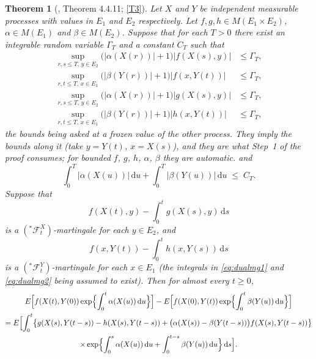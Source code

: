 \documentclass[11pt,a4paper]{article}
\theoremstyle{plain}
\newtheorem{theorem}{Theorem}[section]
\theoremstyle{definition}
\theoremstyle{remark}
\newcommand{\Meas}{M}                          %
\newcommand{\Filt}{\mathcal{F}}
\newcommand{\dif}{\,\mathrm{d}}
\newcommand{\EK}{\cite{EK86}}
\begin{document}
\begin{theorem}[\EK, Theorem 4.4.11; \eqref{T3}]
  \label{thm:duality}
  Let $X$ and $Y$ be independent measurable processes with values in $E_1$ and
  $E_2$ respectively.  Let $f,g,h \in \Meas(E_1 \times E_2)$,
  $\alpha \in \Meas(E_1)$ and $\beta \in \Meas(E_2)$.  Suppose that for each
  $T > 0$ there exist an integrable random variable $\Gamma_T$ and a constant
  $C_T$ such that
  \begin{equation}
    \label{eq:dual1}
    \begin{aligned}
      \sup_{r,s \leq T,\, y \in E_2} \bigl( |\alpha(X(r))| + 1 \bigr) |f(X(s),y)| &\leq \Gamma_T , \\
      \sup_{r,t \leq T,\, x \in E_1} \bigl( |\beta(Y(r))| + 1 \bigr) |f(x,Y(t))| &\leq \Gamma_T , \\
      \sup_{r,s \leq T,\, y \in E_2} \bigl( |\alpha(X(r))| + 1 \bigr) |g(X(s),y)| &\leq \Gamma_T , \\
      \sup_{r,t \leq T,\, x \in E_1} \bigl( |\beta(Y(r))| + 1 \bigr) |h(x,Y(t))| &\leq \Gamma_T ,
    \end{aligned}
  \end{equation}
  the bounds being asked at a \emph{frozen} value of the other process.  They
  imply the bounds along it (take $y = Y(t)$, $x = X(s)$), and they are what
  Step~1 of the proof consumes; for bounded $f$, $g$, $h$, $\alpha$, $\beta$ they
  are automatic.
  and
  \begin{equation}
    \label{eq:dual2}
    \int_0^T |\alpha(X(u))| \dif u + \int_0^T |\beta(Y(u))| \dif u \;\leq\; C_T .
  \end{equation}
  Suppose that
  \begin{equation}
    \label{eq:dualmg1}
    f(X(t),y) - \int_0^t g(X(s),y) \dif s
  \end{equation}
  is a $({}^{*}\Filt^X_t)$-martingale for each $y \in E_2$, and
  \begin{equation}
    \label{eq:dualmg2}
    f(x,Y(t)) - \int_0^t h(x,Y(s)) \dif s
  \end{equation}
  is a $({}^{*}\Filt^Y_t)$-martingale for each $x \in E_1$ (the integrals in
  \eqref{eq:dualmg1} and \eqref{eq:dualmg2} being assumed to exist).  Then for
  almost every $t \geq 0$,
  \begin{multline}
    \label{eq:dualconc}
    E\Bigl[ f(X(t),Y(0)) \exp\Bigl\{ \int_0^t \alpha(X(u)) \dif u \Bigr\} \Bigr]
    - E\Bigl[ f(X(0),Y(t)) \exp\Bigl\{ \int_0^t \beta(Y(u)) \dif u \Bigr\} \Bigr] \\
    = E\Bigl[ \int_0^t \bigl\{ g(X(s),Y(t-s)) - h(X(s),Y(t-s))
        + \bigl( \alpha(X(s)) - \beta(Y(t-s)) \bigr) f(X(s),Y(t-s)) \bigr\} \\
      \times \exp\Bigl\{ \int_0^s \alpha(X(u)) \dif u
        + \int_0^{t-s} \beta(Y(u)) \dif u \Bigr\} \dif s \Bigr].
  \end{multline}
\end{theorem}
\end{document}
